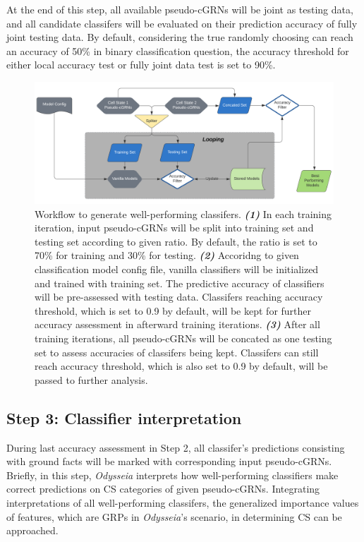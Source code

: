 \documentclass[fleqn,10pt]{wlscirep}
\begin{document}
At the end of this step, all available pseudo-cGRNs will be joint as testing data, and all candidate classifers will be evaluated on their prediction accuracy of fully joint testing data.
By default, considering the true randomly choosing can reach an accuracy of 50\% in binary classification question, the accuracy threshold for either local accuracy test or fully joint data test is set to 90\%.

\begin{figure}[ht]
\centering
\includegraphics[width=1.0\linewidth]{image/Odysseus.png}
\caption{
Workflow to generate well-performing classifers.
\textbf{\emph{(1)}} In each training iteration, input pseudo-cGRNs will be split into training set and testing set according to given ratio.
By default, the ratio is set to 70\% for training and 30\% for testing.
\textbf{\emph{(2)}} Accoridng to given classification model config file, vanilla classifiers will be initialized and trained with training set.
The predictive accuracy of classifiers will be pre-assessed with testing data.
Classifers reaching accuracy threshold, which is set to 0.9 by default, will be kept for further accuracy assessment in afterward training iterations.
\textbf{\emph{(3)}} After all training iterations, all pseudo-cGRNs will be concated as one testing set to assess accuracies of classifers being kept.
Classifers can still reach accuracy threshold, which is also set to 0.9 by default, will be passed to further analysis.
}
\label{odysseus}
\end{figure}

\subsection*{Step 3: Classifier interpretation}
\label{step3}
During last accuracy assessment in Step 2, all classifer's predictions consisting with ground facts will be marked with corresponding input pseudo-cGRNs.
Briefly, in this step, \emph{Odysseia} interprets how well-performing classifiers make correct predictions on CS categories of given pseudo-cGRNs.
Integrating interpretations of all well-performing classifers, the generalized importance values of features, which are GRPs in \emph{Odysseia}'s scenario, in determining CS can be approached.
\end{document}

